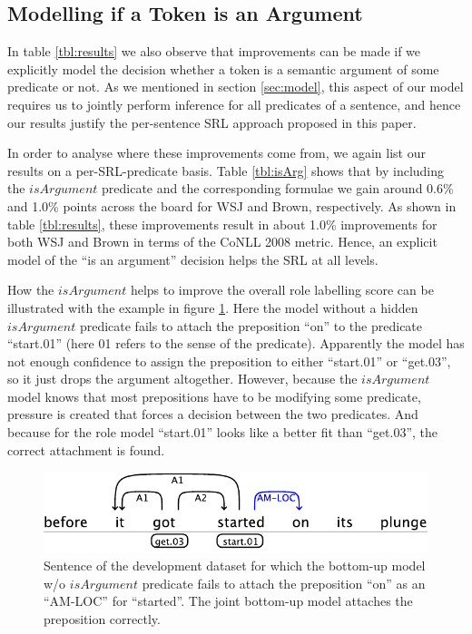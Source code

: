 
\subsection{Modelling if a Token is an Argument}
In table \ref{tbl:results} we also observe that improvements can be made if we explicitly model the decision whether a token is a semantic argument of some predicate or not. As we mentioned in section \ref{sec:model}, this aspect of our model requires us to jointly perform inference for all predicates of a sentence, and hence our results justify the per-sentence SRL approach proposed in this paper.

In order to analyse where these improvements come from, we again list our results on a per-SRL-predicate basis. Table \ref{tbl:isArg} shows that by including the $isArgument$ predicate and the corresponding formulae we gain around 0.6\% and 1.0\% points across the board for WSJ and Brown, respectively. As shown in table \ref{tbl:results}, these improvements result in about 1.0\% improvements for both WSJ and Brown in terms of the CoNLL 2008 metric. Hence, an explicit model of the ``is an argument'' decision helps the SRL at all levels. 

How the $isArgument$ helps to improve the overall role labelling score can be illustrated with the example in figure \ref{fig:isArg}. Here the model without a hidden $isArgument$ predicate fails to attach the preposition ``on'' to the predicate ``start.01'' (here 01 refers to the sense of the predicate). Apparently the model has not enough confidence to assign the preposition to either ``start.01'' or ``get.03'', so it just drops the argument altogether. However, because the $isArgument$ model knows that most prepositions have to be modifying some predicate, pressure is created that forces a decision between the two predicates. And because for the role model ``start.01'' looks like a better fit than ``get.03'', the correct attachment is found.

\begin{figure}
\begin{center}
    \includegraphics[scale=.62]{is-arg-example}
\end{center}
\caption{Sentence of the development dataset for which the bottom-up model w/o $isArgument$ predicate fails to attach the preposition ``on'' as an ``AM-LOC'' for ``started''. The joint bottom-up model attaches the preposition correctly.}
\label{fig:isArg}
\end{figure}


